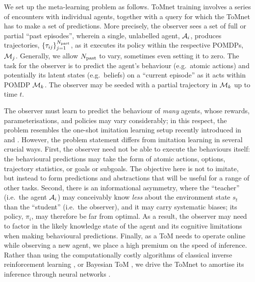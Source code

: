 \documentclass{article}
\begin{document}
We set up the meta-learning problem as follows. ToMnet training involves a series of encounters with individual agents, together with a query for which the ToMnet has to make a set of predictions. More precisely, the observer sees a set of full or partial ``past episodes'', wherein a single, unlabelled agent, $\mathcal{A}_i$, produces trajectories, $\{\tau_{ij}\}_{j=1}^{N_{\mathrm{past}}}$, as it executes its policy within the respective POMDPs, $\mathcal{M}_j$. Generally, we allow $N_{\mathrm{past}}$ to vary, sometimes even setting it to zero. The task for the observer is to predict the agent's behaviour (e.g.\ atomic actions) and potentially its latent states (e.g.\ beliefs) on a ``current episode'' as it acts within POMDP $\mathcal{M}_k$. The observer may be seeded with a partial trajectory in $\mathcal{M}_k$ up to time $t$.

The observer must learn to predict the behaviour of {\it many} agents, whose rewards, parameterisations, and policies may vary considerably; in this respect, the problem resembles the one-shot imitation learning setup recently introduced in \citet{Duan2017} and \citet{wang2017robust}. However, the problem statement differs from imitation learning in several crucial ways. First, the observer need not be able to execute the behaviours itself: the behavioural predictions may take the form of atomic actions, options, trajectory statistics, or goals or subgoals. The objective here is not to imitate, but instead to form predictions and abstractions that will be useful for a range of other tasks. Second, there is an informational asymmetry, where the ``teacher'' (i.e.\ the agent $\mathcal{A}_i$) may conceivably know {\it less} about the environment state $s_t$ than the ``student'' (i.e.\ the observer), and it may carry systematic biases; its policy, $\pi_i$, may therefore be far from optimal. As a result, the observer may need to factor in the likely knowledge state of the agent and its cognitive limitations when making behavioural predictions. Finally, as a ToM needs to operate online while observing a new agent, we place a high premium on the speed of inference. Rather than using the computationally costly algorithms of classical inverse reinforcement learning \citep[e.g.][]{ng2000algorithms, ramachandran2007bayesian, ziebart2008maximum, boularias2011relative}, or Bayesian ToM \citep[e.g.][]{baker2011bayesian, nakahashi2016modeling, Baker2017}, we drive the ToMnet to amortise its inference through neural networks \citep[as in][]{kingma2013auto, rezende2014stochastic, ho2016generative, Duan2017, wang2017robust}.
\end{document}
